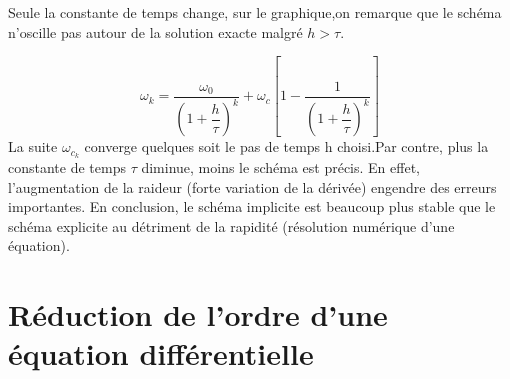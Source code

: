 \documentclass[10pt]{article}
\begin{document}
Seule la constante de temps change, sur le graphique,on remarque que le schéma n’oscille pas autour de la solution exacte malgré $h>\tau$.


$$\omega_{k}=\dfrac{\omega_{0}}{\left(1+\dfrac{h}{\tau}\right)^k} +\omega_c\left[1-\dfrac{1}{\left(1+\dfrac{h}{\tau}\right)^k}\right]$$
La suite $\omega_{c_k}$ converge quelques soit le pas de temps h choisi.Par contre, plus la constante de temps $\tau$ diminue, moins le schéma est précis. En effet, l’augmentation de la raideur (forte variation de la dérivée) engendre des erreurs importantes.
En conclusion, le schéma implicite est beaucoup plus stable que le schéma explicite au détriment de la rapidité (résolution numérique d’une équation).

\section{Réduction de l'ordre d'une équation différentielle}
\end{document}
